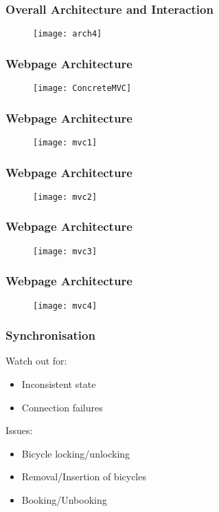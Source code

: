 \begin{frame}
	\frametitle{Overall Architecture and Interaction}
	\begin{figure}
		\centering
		\texttt{[image: arch4]}
	\end{figure}
\end{frame}

\begin{frame}
	\frametitle{Webpage Architecture}
	\begin{figure}
	\centering
		\texttt{[image: ConcreteMVC]}
	\end{figure}
\end{frame}


\begin{frame}
	\frametitle{Webpage Architecture}
	\begin{figure}
		\centering
		\texttt{[image: mvc1]}
	\end{figure}
\end{frame}


\begin{frame}
	\frametitle{Webpage Architecture}
	\begin{figure}
		\centering
		\texttt{[image: mvc2]}
	\end{figure}
\end{frame}


\begin{frame}
	\frametitle{Webpage Architecture}
	\begin{figure}
		\centering
		\texttt{[image: mvc3]}
	\end{figure}
\end{frame}


\begin{frame}
	\frametitle{Webpage Architecture}
	\begin{figure}
		\centering
		\texttt{[image: mvc4]}
	\end{figure}
\end{frame}

\begin{frame}
	\frametitle{Synchronisation}
	Watch out for:
	\begin{itemize}
		\item Inconsistent state
		\item Connection failures
	\end{itemize}
	\pause
	Issues:
	\begin{itemize}
		\item Bicycle locking/unlocking
		\item Removal/Insertion of bicycles
		\item Booking/Unbooking
	\end{itemize}
\end{frame}